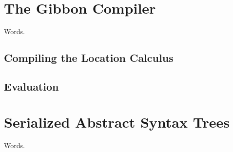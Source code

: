 \documentclass[showabstract,showacknowledgments,showpreface,showdedication]{iuphd}
\begin{document}
\chapter{The Gibbon Compiler}

Words.

\section{Compiling the Location Calculus} \label{sec:impl-local}

\section{Evaluation}

\chapter{Serialized Abstract Syntax Trees}

Words.







%


\newpage


\appendix





\end{document}
